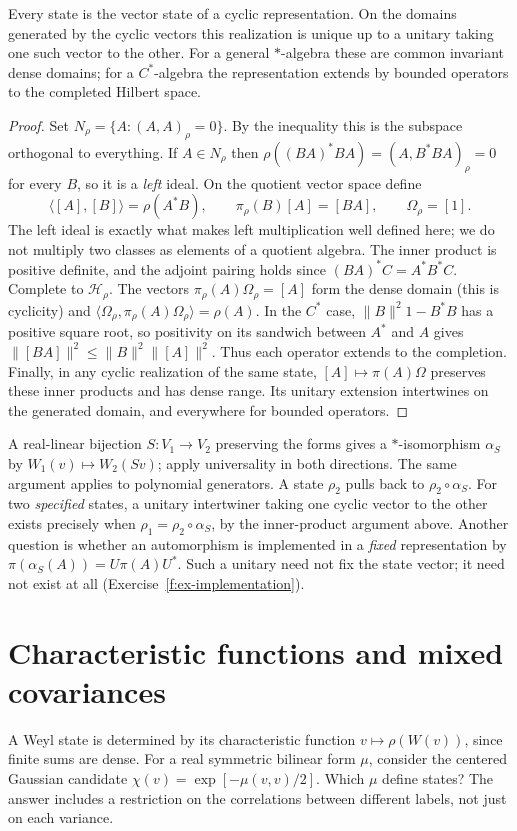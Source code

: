 \begin{theorem}\label{f:gns}
Every state is the vector state of a cyclic representation. On the domains generated by the cyclic vectors this realization is unique up to a unitary taking one such vector to the other. For a general $*$-algebra these are common invariant dense domains; for a $C^*$-algebra the representation extends by bounded operators to the completed Hilbert space.
\end{theorem}
\begin{proof}
Set $N_\rho=\{A:(A,A)_\rho=0\}$. By the inequality this is the subspace orthogonal to everything. If $A\in N_\rho$ then $\rho((BA)^*BA)=(A,B^*BA)_\rho=0$ for every $B$, so it is a \emph{left} ideal. On the quotient vector space define
\[
 \langle[A],[B]\rangle=\rho(A^*B),\qquad
 \pi_\rho(B)[A]=[BA],\qquad \Omega_\rho=[1].
\]
The left ideal is exactly what makes left multiplication well defined here; we do not multiply two classes as elements of a quotient algebra. The inner product is positive definite, and the adjoint pairing holds since $(BA)^*C=A^*B^*C$. Complete to $\mathcal H_\rho$. The vectors $\pi_\rho(A)\Omega_\rho=[A]$ form the dense domain (this is cyclicity) and $\langle\Omega_\rho,\pi_\rho(A)\Omega_\rho\rangle=\rho(A)$. In the $C^*$ case, $\|B\|^2 1-B^*B$ has a positive square root, so positivity on its sandwich between $A^*$ and $A$ gives $\|[BA]\|^2\le\|B\|^2\|[A]\|^2$. Thus each operator extends to the completion. Finally, in any cyclic realization of the same state, $[A]\mapsto\pi(A)\Omega$ preserves these inner products and has dense range. Its unitary extension intertwines on the generated domain, and everywhere for bounded operators.
\end{proof}

A real-linear bijection $S:V_1\to V_2$ preserving the forms gives a $*$-isomorphism $\alpha_S$ by $W_1(v)\mapsto W_2(Sv)$; apply universality in both directions. The same argument applies to polynomial generators. A state $\rho_2$ pulls back to $\rho_2\circ\alpha_S$. For two \emph{specified} states, a unitary intertwiner taking one cyclic vector to the other exists precisely when $\rho_1=\rho_2\circ\alpha_S$, by the inner-product argument above. Another question is whether an automorphism is implemented in a \emph{fixed} representation by $\pi(\alpha_S(A))=U\pi(A)U^*$. Such a unitary need not fix the state vector; it need not exist at all (Exercise~\ref{f:ex-implementation}).

\section{Characteristic functions and mixed covariances}
A Weyl state is determined by its characteristic function $v\mapsto\rho(W(v))$, since finite sums are dense. For a real symmetric bilinear form $\mu$, consider the centered Gaussian candidate $\chi(v)=\exp[-\mu(v,v)/2]$. Which $\mu$ define states? The answer includes a restriction on the correlations between different labels, not just on each variance.

